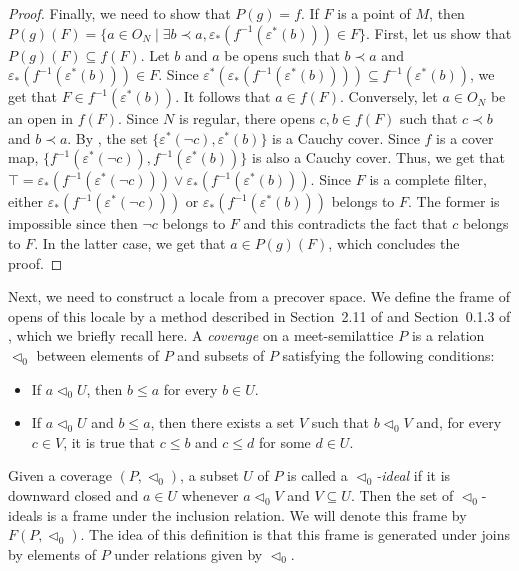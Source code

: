 \documentclass[reqno]{amsart}
\theoremstyle{definition}
\theoremstyle{remark}
\numberwithin{figure}{section}
\newcommand{\rb}{\prec}
\begin{document}
\begin{proof}
Finally, we need to show that $P(g) = f$.
If $F$ is a point of $M$, then $P(g)(F) = \{ a \in O_N \mid \exists b \rb a, \varepsilon_*(f^{-1}(\varepsilon^*(b))) \in F \}$.
First, let us show that $P(g)(F) \subseteq f(F)$.
Let $b$ and $a$ be opens such that $b \rb a$ and $\varepsilon_*(f^{-1}(\varepsilon^*(b))) \in F$.
Since $\varepsilon^*(\varepsilon_*(f^{-1}(\varepsilon^*(b)))) \subseteq f^{-1}(\varepsilon^*(b))$, we get that $F \in f^{-1}(\varepsilon^*(b))$.
It follows that $a \in f(F)$.
Conversely, let $a \in O_N$ be an open in $f(F)$.
Since $N$ is regular, there opens $c,b \in f(F)$ such that $c \rb b$ and $b \rb a$.
By , the set $\{ \varepsilon^*(\neg c), \varepsilon^*(b) \}$ is a Cauchy cover.
Since $f$ is a cover map, $\{ f^{-1}(\varepsilon^*(\neg c)), f^{-1}(\varepsilon^*(b)) \}$ is also a Cauchy cover.
Thus, we get that $\top = \varepsilon_*(f^{-1}(\varepsilon^*(\neg c))) \vee \varepsilon_*(f^{-1}(\varepsilon^*(b)))$.
Since $F$ is a complete filter, either $\varepsilon_*(f^{-1}(\varepsilon^*(\neg c)))$ or $\varepsilon_*(f^{-1}(\varepsilon^*(b)))$ belongs to $F$.
The former is impossible since then $\neg c$ belongs to $F$ and this contradicts the fact that $c$ belongs to $F$.
In the latter case, we get that $a \in P(g)(F)$, which concludes the proof.
\end{proof}

Next, we need to construct a locale from a precover space.
We define the frame of opens of this locale by a method described in Section~2.11 of \cite{stone-spaces} and Section~0.1.3 of \cite{locales-tychonoff}, which we briefly recall here.
A \emph{coverage} on a meet-semilattice $P$ is a relation $\triangleleft_0$ between elements of $P$ and subsets of $P$ satisfying the following conditions:
\begin{itemize}
\item If $a \triangleleft_0 U$, then $b \leq a$ for every $b \in U$.
\item If $a \triangleleft_0 U$ and $b \leq a$, then there exists a set $V$ such that $b \triangleleft_0 V$ and, for every $c \in V$, it is true that $c \leq b$ and $c \leq d$ for some $d \in U$.
\end{itemize}
Given a coverage $(P,\triangleleft_0)$, a subset $U$ of $P$ is called a \emph{$\triangleleft_0$-ideal} if it is downward closed and $a \in U$ whenever $a \triangleleft_0 V$ and $V \subseteq U$.
Then the set of $\triangleleft_0$-ideals is a frame under the inclusion relation.
We will denote this frame by $F(P,\triangleleft_0)$.
The idea of this definition is that this frame is generated under joins by elements of $P$ under relations given by $\triangleleft_0$.
\end{document}
